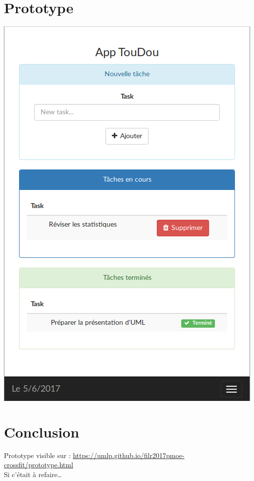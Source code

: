 \documentclass[french]{beamer}
\begin{document}
\section{Prototype}
\begin{frame}
  \begin{center}
  \begin{minipage}[c]{0.4\linewidth}%
   \includegraphics[width=1\linewidth]{prototype}  %
  \end{minipage}
\end{center}
\end{frame}

\section{Conclusion}
\begin{frame}
\begin{center}
  Prototype visible sur : \url{https://umlp.github.io/filr2017pmoe-crossfit/prototype.html}\\
  \vspace{0.5cm}
  Si c'était à refaire\dots
\end{center}
\end{frame}
\end{document}
